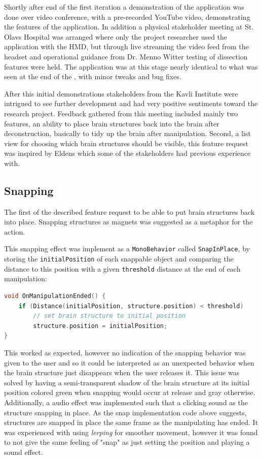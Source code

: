 Shortly after end of the first iteration a demonstration of the application was done over video conference, with a pre-recorded YouTube video, demonstrating the features of the application. In addition a physical stakeholder meeting at St. Olavs Hospital was arranged where only the project researcher used the application with the HMD, but through live streaming the video feed from the headset and operational guidance from Dr. Menno Witter testing of dissection features were held. The application was at this stage nearly identical to what was seen at the end of the , with minor tweaks and bug fixes.

After this initial demonstrations stakeholders from the Kavli Institute were intrigued to see further development and had very positive sentiments toward the research project. Feedback gathered from this meeting included mainly two features, an ability to place brain structures back into the brain after deconstruction, basically to tidy up the brain after manipulation. Second, a list view for choosing which brain structures should be visible, this feature request was inspired by Eldens  which some of the stakeholders had previous experience with.

\subsection{Snapping}
The first of the described feature request to be able to put brain structures back into place. Snapping structures as magnets was suggested as a metaphor for the action. 

This snapping effect was implement as a \texttt{MonoBehavior} called \texttt{SnapInPlace}, by storing the \texttt{initialPosition} of each snappable object and comparing the distance to this position with a given \texttt{threshold} distance at the end of each manipulation: 

\begin{lstlisting}[language=c]
void OnManipulationEnded() {
    if (Distance(initialPosition, structure.position) < threshold) 
        // set brain structure to initial position 
        structure.position = initialPosition; 
}
\end{lstlisting}

This worked as expected, however no indication of the snapping behavior was given to the user and so it could be interpreted as an unexpected behavior when the brain structure just disappears when the user releases it. This issue was solved by having a semi-transparent shadow of the brain structure at its initial position colored green when snapping would occur at release and gray otherwise. Additionally, a audio effect was implemented such that a clicking sound as the structure snapping in place. 
As the snap implementation code above suggests, structures are snapped in place the same frame as the manipulating has ended. It was experienced with using \textit{lerping} for smoother movement, however it was found to not give the same feeling of "snap" as just setting the position and playing a sound effect.

